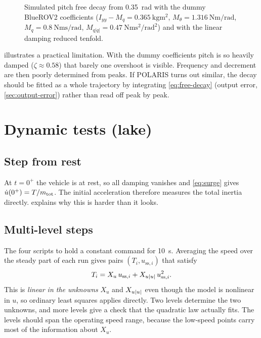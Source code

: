 \begin{figure}[htbp]
\centering
{}
\caption{Simulated pitch free decay from \qty{0.35}{\radian} with the dummy BlueROV2
coefficients ($I_{yy} - M_{\dot q} = \qty{0.365}{\kilogram\meter\squared}$,
$M_\theta = \qty{1.316}{\newton\meter\per\radian}$, $M_q = \qty{0.8}{\newton\meter\second\per\radian}$,
$M_{q|q|} = \qty{0.47}{\newton\meter\second\squared\per\radian\squared}$) and with the linear
damping reduced tenfold.}
\label{fig:decay}
\end{figure}
\FloatBarrier

 illustrates a practical limitation. With the dummy coefficients pitch is so
heavily damped ($\zeta\approx0.58$) that barely one overshoot is visible. Frequency and
decrement are then poorly determined from peaks. If POLARIS turns out similar, the decay
should be fitted as a whole trajectory by integrating \eqref{eq:free-decay}
(output error, \cref{sec:output-error}) rather than read off peak by peak.

\section{Dynamic tests (lake)}

\subsection{Step from rest}

At $t = 0^+$ the vehicle is at rest, so all damping vanishes and \eqref{eq:surge} gives
$\dot u(0^+) = T/m_\mathrm{tot}$. The initial acceleration therefore measures the total inertia
directly.  explains why this is harder than it looks.

\subsection{Multi-level steps}

The four scripts  to  hold a constant command for
\qty{10}{\second}. Averaging the speed over the steady part of each run gives pairs
$(T_i, u_{\mathrm{ss},i})$ that satisfy
\begin{equation}
  T_i = X_u\,u_{\mathrm{ss},i} + X_{u|u|}\,u_{\mathrm{ss},i}^2 .
  \label{eq:ss-regression}
\end{equation}
This is \emph{linear in the unknowns} $X_u$ and $X_{u|u|}$ even though the model is nonlinear in
$u$, so ordinary least squares applies directly. Two levels determine the two unknowns, and
more levels give a check that the quadratic law actually fits. The levels should span the
operating speed range, because the low-speed points carry most of the information about $X_u$.

